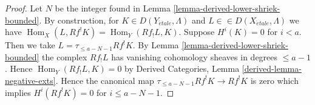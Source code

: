 \documentclass{stacks-project}
\theoremstyle{plain}
\theoremstyle{definition}
\theoremstyle{remark}
\numberwithin{equation}{subsection}
\def\Hom{\mathop{\mathrm{Hom}}\nolimits}
\def\etale{{\acute{e}tale}}
\begin{document}
\begin{proof}
Let $N$ be the integer found in Lemma \ref{lemma-derived-lower-shriek-bounded}.
By construction, for $K \in D(Y_\etale, \Lambda)$ and
$L \in \in D(X_\etale, \Lambda)$ we have
$\Hom_X(L, Rf^!K) = \Hom_Y(Rf_!L, K)$. Suppose $H^i(K) = 0$
for $i < a$. Then we take $L = \tau_{\leq a - N - 1}Rf^!K$. By
Lemma \ref{lemma-derived-lower-shriek-bounded}
the complex $Rf_!L$ has vanishing cohomology sheaves in
degrees $\leq a - 1$. Hence $\Hom_Y(Rf_!L, K) = 0$ by
Derived Categories, Lemma \ref{derived-lemma-negative-exts}.
Hence the canonical map $\tau_{\leq a - N - 1}Rf^!K \to Rf^!K$
is zero which implies $H^i(Rf^!K) = 0$ for $i \leq a - N - 1$.
\end{proof}
\end{document}
